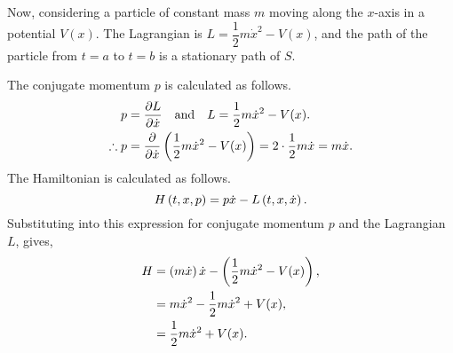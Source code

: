 Now, considering a particle of constant mass $m$ moving along the $x$-axis in a potential $V(x)$. The Lagrangian is $L=\dfrac{1}{2}m\dot{x}^2 - V(x)$, and the path of the particle from $t=a$ to $t=b$ is a stationary path of $S$.

The conjugate momentum $p$ is calculated as follows.
\begin{align*}
	p &= \frac{\partial L}{\partial \dot{x}}\quad\text{and}\quad L=\dfrac{1}{2}m\dot{x}^2 - V(x).\\
	\therefore p&=\frac{\partial }{\partial \dot{x}}\left(\dfrac{1}{2}m\dot{x}^2 - V(x)\right) = 2\cdot\frac{1}{2} m\dot{x} = m\dot{x}.
\end{align*}
The Hamiltonian is calculated as follows.
\[
	H\left(t,x,p\right)=p\dot{x}-L\left(t,x,\dot{x}\right).
\]
Substituting into this expression for conjugate momentum $p$ and the Lagrangian $L$, gives,
\begin{align*}
	H &= \left(m\dot{x}\right)\dot{x} - \left(\dfrac{1}{2}m\dot{x}^2 - V(x)\right),\\
	&=m\dot{x}^2 - \dfrac{1}{2}m\dot{x}^2 + V(x),\\
	&=\dfrac{1}{2}m\dot{x}^2 + V(x).
\end{align*}
